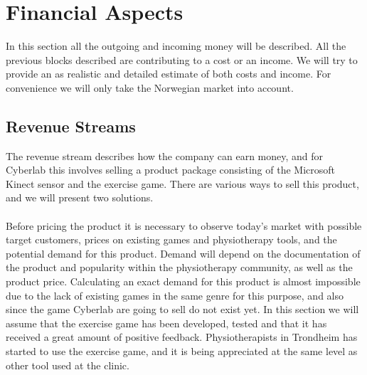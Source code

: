 \section{Financial Aspects}
In this section all the outgoing and incoming money will be described. All the previous blocks described are contributing to a cost or an income. We will try to provide an as realistic and detailed estimate of both costs and income. For convenience we will only take the Norwegian market into account. 
\subsection{Revenue Streams}
The revenue stream describes how the company can earn money, and for Cyberlab this involves selling a product package consisting of the Microsoft Kinect sensor and the exercise game. There are various ways to sell this product, and we will present two solutions.\\ \\
Before pricing the product it is necessary to observe today's market with possible target customers, prices on existing games and physiotherapy tools, and the potential demand for this product. Demand will depend on the documentation of the product and popularity within the physiotherapy community, as well as the product price. Calculating an exact demand for this product is almost impossible due to the lack of existing games in the same genre for this purpose, and also since the game Cyberlab are going to sell do not exist yet. In this section we will assume that the exercise game has been developed, tested and that it has received a great amount of positive feedback. Physiotherapists in Trondheim has started to use the exercise game, and it is being appreciated at the same level as other tool used at the clinic. \\ \\
